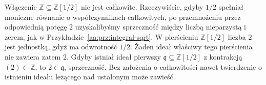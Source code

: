 \begin{przyklad}
\label{aa:prz:integral-localization-failure}
Włączenie $\mathbb Z\subseteq\mathbb Z[1/2]$ nie jest
całkowite. Rzeczywiście, gdyby $1/2$ spełniał
moniczne równanie o współczynnikach całkowitych,
po przemnożeniu przez odpowiednią potęgę $2$
uzyskalibyśmy sprzeczność między liczbą nieparzystą
i zerem, jak w Przykładzie~\ref{aa:prz:integral-sqrt}.
W pierścieniu $\mathbb Z[1/2]$ liczba $2$ jest jednostką,
gdyż ma odwrotność $1/2$. Żaden ideał właściwy tego
pierścienia nie zawiera zatem $2$. Gdyby istniał
ideał pierwszy $\mathfrak q\subseteq\mathbb Z[1/2]$
z kontrakcją $(2)\subset\mathbb Z$, to $2\in\mathfrak q$,
sprzeczność. Bez założenia o całkowitości nawet twierdzenie
o istnieniu ideału leżącego nad ustalonym może zawieść.
\end{przyklad}

